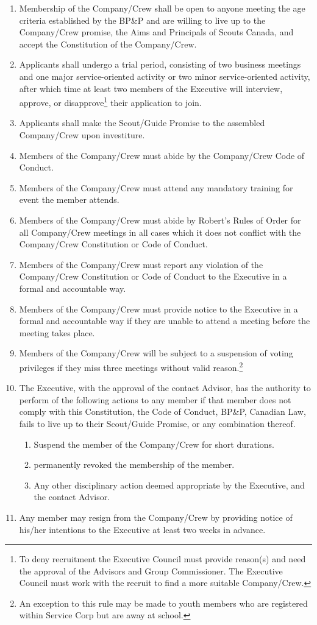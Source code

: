 \begin{enumerate}
    \item Membership of the Company/Crew shall be open to anyone meeting the age criteria established by the BP\&P and are willing to live up to the Company/Crew promise, the Aims and Principals of Scouts Canada, and accept the Constitution of the Company/Crew.
    \item Applicants shall undergo a trial period, consisting of two business meetings and one major service-oriented activity or two minor service-oriented activity, after which time at least two members of the Executive will interview, approve, or disapprove\footnote{To deny recruitment the Executive Council must provide reason(s) and need the approval of the Advisors and Group Commissioner. The Executive Council must work with the recruit to find a more suitable Company/Crew.} their application to join.
    \item Applicants shall make the Scout/Guide Promise to the assembled Company/Crew upon investiture.
    \item Members of the Company/Crew must abide by the Company/Crew Code of Conduct.
    \item Members of the Company/Crew must attend any mandatory training for event the member attends.
    \item Members of the Company/Crew must abide by Robert's Rules of Order for all Company/Crew meetings in all cases which it does not conflict with the Company/Crew Constitution or Code of Conduct.
    \item Members of the Company/Crew must report any violation of the Company/Crew Constitution or Code of Conduct to the Executive in a formal and accountable way.
    \item Members of the Company/Crew must provide notice to the Executive in a formal and accountable way if they are unable to attend a meeting before the meeting takes place.
    \item Members of the Company/Crew will be subject to a suspension of voting privileges if they miss three meetings without valid reason.\footnote{An exception to this rule may be made to youth members who are registered within Service Corp but are away at school.}
    \item The Executive, with the approval of the contact Advisor, has the authority to perform of the following actions to any member if that member does not comply with this Constitution, the Code of Conduct, BP\&P, Canadian Law, fails to live up to their Scout/Guide Promise, or any combination thereof.
    \begin{enumerate}
        \item Suspend the member of the Company/Crew for short durations.
        \item permanently revoked the membership of the member.
        \item Any other disciplinary action deemed appropriate by the Executive, and the contact Advisor.
    \end{enumerate}
    \item Any member may resign from the Company/Crew by providing notice of his/her intentions to the Executive at least two weeks in advance.
\end{enumerate}
